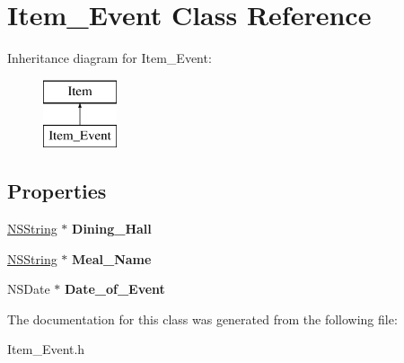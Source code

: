 \hypertarget{interface_item___event}{
\section{Item\_\-Event Class Reference}
\label{interface_item___event}
}
Inheritance diagram for Item\_\-Event:\begin{figure}[H]
\begin{center}
\leavevmode
\includegraphics[height=2.000000cm]{interface_item___event}
\end{center}
\end{figure}
\subsection*{Properties}
\begin{DoxyCompactItemize}
\item 
\hypertarget{interface_item___event_a81f84ca98e2bda5c19c4cb44d394650a}{
\hyperlink{class_n_s_string}{NSString} $\ast$ {\bfseries Dining\_\-Hall}}
\label{interface_item___event_a81f84ca98e2bda5c19c4cb44d394650a}

\item 
\hypertarget{interface_item___event_a1341326a033589eef98ee72b77e3de78}{
\hyperlink{class_n_s_string}{NSString} $\ast$ {\bfseries Meal\_\-Name}}
\label{interface_item___event_a1341326a033589eef98ee72b77e3de78}

\item 
\hypertarget{interface_item___event_acff17dc5c7e35b606a3b6cb33b397ed5}{
NSDate $\ast$ {\bfseries Date\_\-of\_\-Event}}
\label{interface_item___event_acff17dc5c7e35b606a3b6cb33b397ed5}

\end{DoxyCompactItemize}


The documentation for this class was generated from the following file:\begin{DoxyCompactItemize}
\item 
Item\_\-Event.h\end{DoxyCompactItemize}
